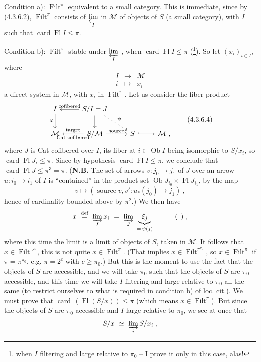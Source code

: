 \documentclass[11pt]{article}
\newcommand{\printedpage}[1]{\marginpar{\footnotesize p.~#1}}
\newcommand{\msp}[1]{\marginpar{\footnotesize [#1]}}
\newcommand{\Ob}{\operatorname{Ob}}
\newcommand{\card}{\operatorname{card}}
\newcommand{\Fl}{\operatorname{Fl}}
\newcommand{\Filt}{\operatorname{Filt}}
\begin{document}
\printedpage{13}

\noindent\msp{page 74}Condition a): $\Filt^\pi$ equivalent to a small category. This is immediate, since by (4.3.6.2), $\Filt^\pi$ consists of $\varprojlim\limits_I$ in $\mathcal M$ of objects of $S$ (a small category), with $I$ such that $\card\Fl I\leqslant\pi$.

\noindent Condition b): $\Filt^\pi$ stable under $\varprojlim\limits_I$ , when $\card\Fl I\leqslant\pi$ (\footnote{when $I$ filtering and large relative to $\pi_0$ -- I prove it only in this case, alas!}). So let $(x_i)_{i\in I}$, where
\[
\begin{array}{ccc}
I & \longrightarrow & \mathcal M\\[1ex]
i & \longmapsto & x_i
\end{array}
\]
a direct system in $\mathcal M$, with $x_i$ in $\Filt^\pi$. Let us consider the fiber product
\[
\begin{tikzcd}
I \arrow[d, "\varphi"'] & S/I = J \arrow[l, "\text{cofibered}"'] \arrow[d] \arrow[dr, dotted, "\psi"] & & \\
\mathcal M & S/\mathcal M \arrow[l, "\text{target}"', "\text{Cat-cofibered}"] \arrow[r, "\text{source}"] & S \arrow[r, hook] & \mathcal M\ ,
\end{tikzcd}
\tag*{(4.3.6.4)}
\]
where $J$ is Cat-cofibered over $I$, its fiber at $i\in\Ob I$ being isomorphic to $S/x_i$, so $\card\Fl J_i\leqslant\pi$. Since by hypothesis $\card\Fl I\leqslant\pi$, we conclude that $\card\Fl J\leqslant\pi^3=\pi$. (\textbf{N.B.} The set of arrows $v:j_0\longrightarrow j_1$ of $J$ over an arrow $u:i_0\longrightarrow i_1$ of $I$ is ``contained'' in the product set $\Ob J_{i_0}\times\Fl J_{i_1}$, by the map
\[
v\longmapsto(\operatorname{source}v,v':u_*(j_0)\longrightarrow j_1)\ ,
\]
hence of cardinality bounded above by $\pi^2$.) We \msp{page 75}then have
\[
x\ \overset{\text{def}}{=}\ \varinjlim_I x_i\ =\ \varinjlim_J\ \underbrace{\xi_j}_{=\,\psi(j)}\qquad\quad\mbox{(\footnotemark)}\ ,
\]
%
where this time the limit is a limit of objects of $S$, taken in $\mathcal M$. It follows that $x\in\Filt'^{\pi}$, this is not quite $x\in\Filt^\pi$. (That implies $x\in\Filt^{\pi^{\pi_0}}$, so $x\in\Filt^\pi$ if $\pi=\pi^{\pi_0}$, e.g. $\pi=2^c$ with $c\geqslant\pi_0$.) But this is the moment to use the fact that the objects of $S$ are accessible, and we will take $\pi_0$ such that the objects of $S$ are $\pi_0$-accessible, and this time we will take $I$ filtering and large relative to $\pi_0$ all the same (to restrict ourselves to what is required in condition b) of loc. cit.). We must prove that $\card\,(\Fl(S/x))\leqslant\pi$ (which means $x\in\Filt^\pi$). But since the objects of $S$ are $\pi_0$-accessible and $I$ large relative to $\pi_0$, we see at once that
\[
S/x\ \simeq\ \varinjlim_i S/x_i\ ,
\]
\end{document}
